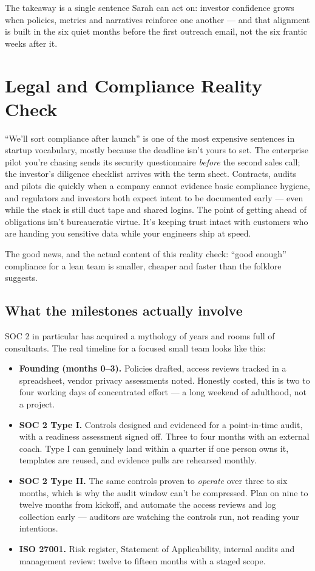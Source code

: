 The takeaway is a single sentence Sarah can act on: investor confidence grows when policies, metrics and narratives reinforce one another — and that alignment is built in the six quiet months before the first outreach email, not the six frantic weeks after it.

\section{Legal and Compliance Reality Check}
``We'll sort compliance after launch'' is one of the most expensive sentences in startup vocabulary, mostly because the deadline isn't yours to set. The enterprise pilot you're chasing sends its security questionnaire \emph{before} the second sales call; the investor's diligence checklist arrives with the term sheet. Contracts, audits and pilots die quickly when a company cannot evidence basic compliance hygiene, and regulators and investors both expect intent to be documented early — even while the stack is still duct tape and shared logins. The point of getting ahead of obligations isn't bureaucratic virtue. It's keeping trust intact with customers who are handing you sensitive data while your engineers ship at speed.


The good news, and the actual content of this reality check: ``good enough'' compliance for a lean team is smaller, cheaper and faster than the folklore suggests.



\subsection{What the milestones actually involve}


SOC 2 in particular has acquired a mythology of years and rooms full of consultants. The real timeline for a focused small team looks like this:


\begin{itemize}[leftmargin=*]
\item \textbf{Founding (months 0–3).} Policies drafted, access reviews tracked in a spreadsheet, vendor privacy assessments noted. Honestly costed, this is two to four working days of concentrated effort — a long weekend of adulthood, not a project.
\item \textbf{SOC 2 Type I.} Controls designed and evidenced for a point-in-time audit, with a readiness assessment signed off. Three to four months with an external coach. Type I can genuinely land within a quarter if one person owns it, templates are reused, and evidence pulls are rehearsed monthly.
\item \textbf{SOC 2 Type II.} The same controls proven to \emph{operate} over three to six months, which is why the audit window can't be compressed. Plan on nine to twelve months from kickoff, and automate the access reviews and log collection early — auditors are watching the controls run, not reading your intentions.
\item \textbf{ISO 27001.} Risk register, Statement of Applicability, internal audits and management review: twelve to fifteen months with a staged scope.
\end{itemize}

